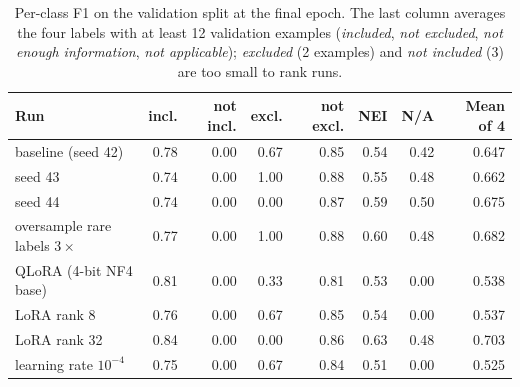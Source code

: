 \begin{table}[t]
\centering
\footnotesize
\caption{Per-class F1 on the validation split at the final epoch. The last column averages the four labels with at least 12 validation examples (\emph{included}, \emph{not excluded}, \emph{not enough information}, \emph{not applicable}); \emph{excluded} (2 examples) and \emph{not included} (3) are too small to rank runs.}
\label{tab:perclassval}
\begin{tabular}{lrrrrrrr}
\toprule
Run & incl. & not incl. & excl. & not excl. & NEI & N/A & Mean of 4 \\
\midrule
baseline (seed 42) & 0.78 & 0.00 & 0.67 & 0.85 & 0.54 & 0.42 & 0.647 \\
seed 43 & 0.74 & 0.00 & 1.00 & 0.88 & 0.55 & 0.48 & 0.662 \\
seed 44 & 0.74 & 0.00 & 0.00 & 0.87 & 0.59 & 0.50 & 0.675 \\
oversample rare labels $3\times$ & 0.77 & 0.00 & 1.00 & 0.88 & 0.60 & 0.48 & 0.682 \\
QLoRA (4-bit NF4 base) & 0.81 & 0.00 & 0.33 & 0.81 & 0.53 & 0.00 & 0.538 \\
LoRA rank 8 & 0.76 & 0.00 & 0.67 & 0.85 & 0.54 & 0.00 & 0.537 \\
LoRA rank 32 & 0.84 & 0.00 & 0.00 & 0.86 & 0.63 & 0.48 & 0.703 \\
learning rate $10^{-4}$ & 0.75 & 0.00 & 0.67 & 0.84 & 0.51 & 0.00 & 0.525 \\
\bottomrule
\end{tabular}
\end{table}
